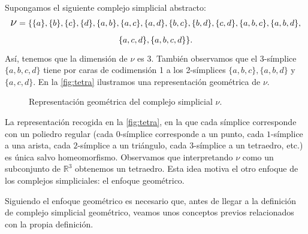 \documentclass[12pt, a4paper, twoside]{book}
\numberwithin{equation}{section}
\theoremstyle{definition}
\newenvironment{ejem}
  {\pushQED{\qed}\renewcommand{\qedsymbol}{$\blacktriangleleft$}\ejemplo}
  {\popQED\endejemplo}
\theoremstyle{remark}
\theoremstyle{plain}
\begin{document}
	\begin{ejem}
		\label{ejem:1}
		Supongamos el siguiente complejo simplicial abstracto:
		\begin{multline*} 
			\text{{\Large $\nu$}}=\{\{a\},\{b\},\{c\},\{d\},
			\{a,b\},\{a,c\},\{a,d\},\{b,c\},\{b,d\},\{c,d\},
			\{a,b,c\},\{a,b,d\},\\
			\{a,c,d\},\{a,b,c,d\}\}.
		\end{multline*}
		Así, tenemos que la dimensión de {\Large $\nu$} es 3. También 
		observamos que el 3-símplice $\{a,b,c,d\}$ tiene por caras de 
		codimensión 1 a los 2-símplices $\{a,b,c\},\{a,b,d\}$ y 
		$\{a,c,d\}$. En la \autoref{fig:tetra} ilustramos una 
		representación geométrica de {\Large $\nu$}.

		\begin{figure}[!htbp]
			\centering
			\caption{Representación geométrica del complejo simplicial {\Large $\nu$}.}
			\label{fig:tetra}
		\end{figure}

		La representación recogida en la \autoref{fig:tetra}, en la
		que cada símplice corresponde con un poliedro regular (cada 
		$0$-símplice corresponde a un punto, cada $1$-símplice a una 
		arista, cada $2$-símplice a un triángulo, cada $3$-símplice a 
		un tetraedro, etc.) es única salvo homeomorfismo. Observamos 
		que interpretando {\Large $\nu$} como un subconjunto de 
		$\mathbb{R}^{3}$ obtenemos un tetraedro. Esta idea motiva el 
		otro enfoque de los complejos simpliciales: el enfoque 
		geométrico.
	\end{ejem}

	Siguiendo el enfoque geométrico es necesario que, antes de llegar a la
	definición de complejo simplicial geométrico, veamos unos conceptos 
	previos relacionados con la propia definición.
\end{document}
